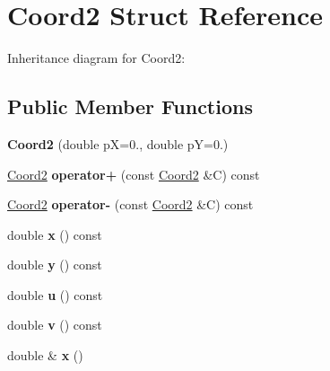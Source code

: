 \hypertarget{structCoord2}{}\section{Coord2 Struct Reference}
\label{structCoord2}


Inheritance diagram for Coord2\+:
\subsection*{Public Member Functions}
\begin{DoxyCompactItemize}
\item 
{\bfseries Coord2} (double pX=0., double pY=0.)\hypertarget{structCoord2_a73afd5bd8714ac0f056c7fcb748ea780}{}\label{structCoord2_a73afd5bd8714ac0f056c7fcb748ea780}

\item 
\hyperlink{structCoord2}{Coord2} {\bfseries operator+} (const \hyperlink{structCoord2}{Coord2} \&C) const \hypertarget{structCoord2_aea7987427429a3d06539e4bd80bc7081}{}\label{structCoord2_aea7987427429a3d06539e4bd80bc7081}

\item 
\hyperlink{structCoord2}{Coord2} {\bfseries operator-\/} (const \hyperlink{structCoord2}{Coord2} \&C) const \hypertarget{structCoord2_a3b96fc8a8748333ddeb03e662b398193}{}\label{structCoord2_a3b96fc8a8748333ddeb03e662b398193}

\item 
double {\bfseries x} () const \hypertarget{structCoord2_a1a3d32910c66a77cc83653803ac1672b}{}\label{structCoord2_a1a3d32910c66a77cc83653803ac1672b}

\item 
double {\bfseries y} () const \hypertarget{structCoord2_ad30cf22af8888271a2d0f94237388d15}{}\label{structCoord2_ad30cf22af8888271a2d0f94237388d15}

\item 
double {\bfseries u} () const \hypertarget{structCoord2_ac27d950d0f08e005112731cc496acb86}{}\label{structCoord2_ac27d950d0f08e005112731cc496acb86}

\item 
double {\bfseries v} () const \hypertarget{structCoord2_a886054acee4c40d4f73dc05d144c7d4d}{}\label{structCoord2_a886054acee4c40d4f73dc05d144c7d4d}

\item 
double \& {\bfseries x} ()\hypertarget{structCoord2_a101b38b9034cad982fa88b6119877798}{}\label{structCoord2_a101b38b9034cad982fa88b6119877798}


\end{DoxyCompactItemize}
